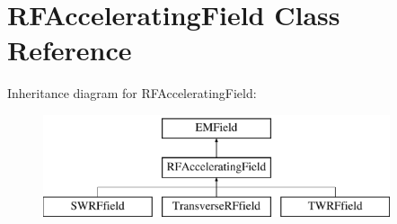 \hypertarget{classRFAcceleratingField}{}\section{R\+F\+Accelerating\+Field Class Reference}
\label{classRFAcceleratingField}
Inheritance diagram for R\+F\+Accelerating\+Field\+:\begin{figure}[H]
\begin{center}
\leavevmode
\includegraphics[height=3.000000cm]{classRFAcceleratingField}
\end{center}
\end{figure}
